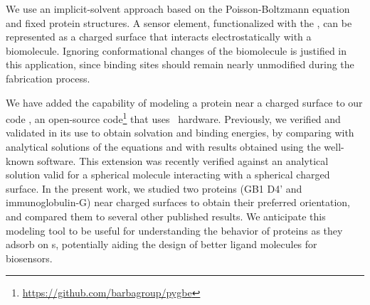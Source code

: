 We use an implicit-solvent approach based on the Poisson-Boltzmann equation and fixed protein structures. A sensor element, functionalized with the \sam, can be represented as a charged surface that interacts electrostatically with a biomolecule. Ignoring conformational changes of the biomolecule is justified in this application, since binding sites should remain nearly unmodified during the fabrication process.\cite{TajimaTakaiIshihara2011} 

We have added the capability of modeling a protein near a charged surface to our code \pygbe , an open-source code\footnote{\url{https://github.com/barbagroup/pygbe}}  that uses \gpu\ hardware.  Previously, we verified and validated \pygbe in its use to obtain solvation and binding energies, by comparing with analytical solutions of the equations and with results obtained using the well-known \apbs software.\cite{CooperBarba-share154331,CooperBardhanBarba2013} 
This extension was recently verified against an analytical solution valid for a spherical molecule interacting with a spherical charged surface.\cite{CooperBarba2015a}
In the present work, we studied two proteins (GB1 D4' and immunoglobulin-G) near charged surfaces to obtain their preferred orientation, and compared them to several other published results.
We anticipate this modeling tool to be useful for understanding the behavior of proteins as they adsorb on \sam s, potentially aiding the design of better ligand molecules for biosensors.

